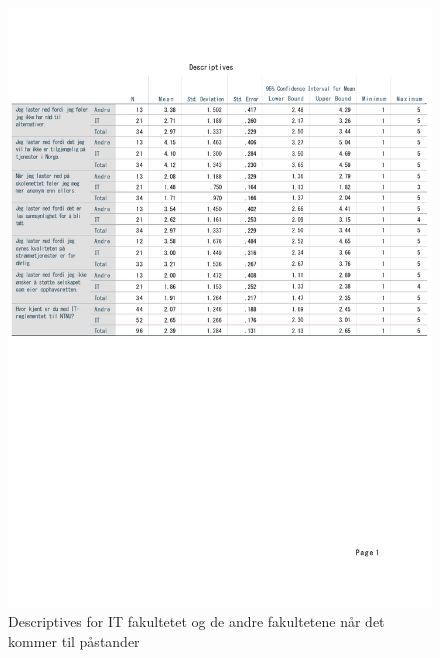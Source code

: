 \begin{figure}[H]
    \centering
    \includegraphics[scale=0.6]{case_1/bilder/fakultet_pastander_descriptive.pdf}
    \caption{Descriptives for IT fakultetet og de andre fakultetene når det kommer til påstander}
    \label{fig:fakultet_pastander_descriptive}
\end{figure}

